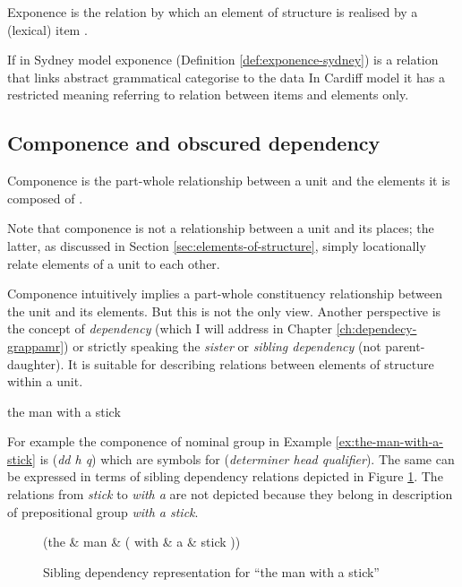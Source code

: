 \begin{definition}\label{def:exponence}
    Exponence is the relation by which an element of structure is realised by a (lexical) item \citep[254]{Fawcett2000}. 
\end{definition}

If in Sydney model exponence (Definition \ref{def:exponence-sydney}) is a relation that links abstract grammatical categorise to the data In Cardiff model it has a restricted meaning referring to relation between items and elements only. 

\subsection{Componence and obscured dependency}
\label{sec:componence}
\begin{definition}[Componence]\label{def:componence}
    Componence is the part-whole relationship between a unit and the elements it is composed of \citep[244]{Fawcett2000}. 
\end{definition}

Note that componence is not a relationship between a unit and its places; the latter, as discussed in Section \ref{sec:elements-of-structure}, simply locationally relate elements of a unit to each other.

Componence intuitively implies a part-whole constituency relationship between the unit and its elements. But this is not the only view. Another perspective is the concept of \textit{dependency} (which I will address in Chapter \ref{ch:dependecy-grappamr}) or strictly speaking the \textit{sister} or \textit{sibling dependency} (not parent-daughter). 
It is suitable for describing relations between elements of structure within a unit. 

\begin{exe}
    \ex\label{ex:the-man-with-a-stick} the man with a stick
\end{exe}

For example the componence of nominal group in Example \ref{ex:the-man-with-a-stick} is (\textit{dd h q}) which are symbols for (\textit{determiner head qualifier}). The same can be expressed in terms of sibling dependency relations depicted in Figure \ref{fig:dep-example-man-with-a-stick}. The relations from \textit{stick} to \textit{with a} are not depicted because they belong in description of prepositional group \textit{with a stick}.

\begin{figure}[!ht]
    \centering
    \begin{dependency}
        \begin{deptext}[column sep=1em]
            (the \& man \& ( with \& a \& stick )) \\
        \end{deptext}
    \end{dependency}
	\caption{Sibling dependency representation for ``the man with a stick''}
    \label{fig:dep-example-man-with-a-stick}
\end{figure}

